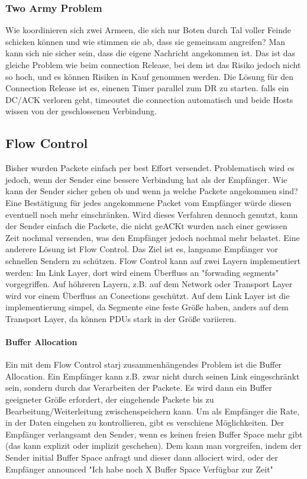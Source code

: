 		\subsubsection{Two Army Problem}
		Wie koordinieren sich zwei Armeen, die sich nur Boten durch Tal voller Feinde schicken können und wie stimmen sie ab, dass sie gemeinsam angreifen? Man kann sich nie sicher sein, dass die eigene Nachricht angekommen ist. Das ist das gleiche Problem wie beim connection Release, bei dem ist das Risiko jedoch nicht so hoch, und es können Risiken in Kauf genommen werden. Die Lösung für den Connection Release ist es, einenen Timer parallel zum DR zu starten. falls ein DC/ACK verloren geht, timeoutet die connection automatisch und beide Hosts wissen von der geschlossenen Verbindung. 

	\subsection{Flow Control}
		Bisher wurden Packete einfach per best Effort versendet. Problematisch wird es jedoch, wenn der Sender eine bessere Verbindung hat als der Empfänger. Wie kann der Sender sicher gehen ob und wenn ja welche Packete angekommen sind? Eine Bestätigung für jedes angekommene Packet vom Empfänger würde diesen eventuell noch mehr einschränken. Wird dieses Verfahren dennoch genutzt, kann der Sender einfach die Packete, die nicht geACKt wurden nach einer gewissen Zeit nochmal versenden, was den Empfänger jedoch nochmal mehr belastet. 
		Eine anderere Lösung ist Flow Control. Das Ziel ist es, langsame Empfänger vor schnellen Sendern zu schützen. Flow Control kann auf zwei Layern implementiert werden: Im Link Layer, dort wird einem Überfluss an "forwading segments" vorgegriffen. Auf höhreren Layern, z.B. auf dem Network oder Transport Layer wird vor einem Überfluss an Conections geschützt. Auf dem Link Layer ist die implementierung simpel, da Segmente eine feste Größe haben, anders auf dem Transport Layer, da können PDUs stark in der Größe variieren. 
		
		\paragraph{Buffer Allocation}
			Ein mit dem Flow Control starj zusammenhängendes Problem ist die Buffer Allocation. Ein Empfänger kann z.B. zwar nicht durch seinen Link eingeschränkt sein, sondern durch das Verarbeiten der Packete. Es wird dann ein Buffer geeigneter Größe erfordert, der eingehende Packete bis zu Bearbeitung/Weiterleitung zwischenspeichern kann. Um als Empfänger die Rate, in der Daten eingehen zu kontrollieren, gibt es verschiene Möglichkeiten. Der Empfänger verlangsamt den Sender, wenn es keinen freien Buffer Space mehr gibt (das kann explizit oder implizit geschehen). Dem kann man vorgreifen, indem der Sender initial Buffer Space anfragt und dieser dann allociert wird, oder der Empfänger announced "Ich habe noch X Buffer Space Verfügbar zur Zeit"
		
